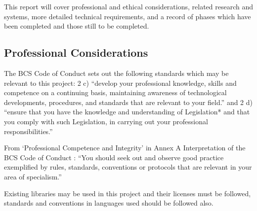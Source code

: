 \documentclass{article}
\begin{document}
%


This report will cover professional and ethical considerations, related research and systems, more detailed technical requirements, and a record of phases which have been completed and those still to be completed.

\subsection{Professional Considerations}
The BCS Code of Conduct \cite{bcscoc} sets out the following standards which may be relevant to this project: 2 c) “develop your professional knowledge, skills and competence on a continuing basis, maintaining awareness of technological developments, procedures, and standards that are relevant to your field.” and 2 d) “ensure that you have the knowledge and understanding of Legislation* and that you comply with such Legislation, in carrying out your professional responsibilities.”

From ‘Professional Competence and Integrity’ in Annex A Interpretation of the BCS Code of Conduct \cite{bcscoca}: “You should seek out and observe good practice exemplified by rules, standards, conventions or protocols that are relevant in your area of specialism.”

Existing libraries may be used in this project and their licenses must be followed, standards and conventions in languages used should be followed also.



\end{document}
